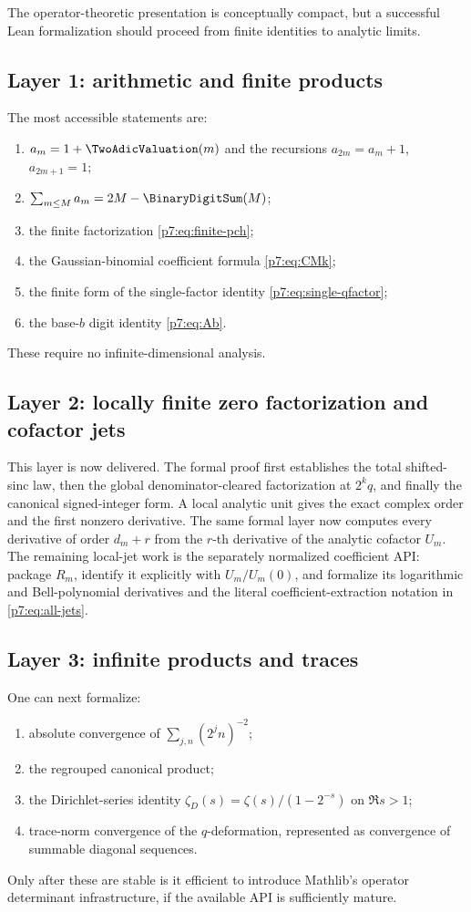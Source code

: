\documentclass[11pt]{article}
\numberwithin{equation}{section}
\theoremstyle{definition}
\theoremstyle{remark}
\begin{document}
The operator-theoretic presentation is conceptually compact, but a successful Lean formalization should proceed from finite identities to analytic limits.

\subsection{Layer 1: arithmetic and finite products}

The most accessible statements are:
\begin{enumerate}[leftmargin=2em]
\item $a_m=1+\TwoAdicValuation(m)$ and the recursions $a_{2m}=a_m+1$, $a_{2m+1}=1$;
\item $\sum_{m\le M}a_m=2M-\BinaryDigitSum(M)$;
\item the finite factorization \cref{p7:eq:finite-pch};
\item the Gaussian-binomial coefficient formula \cref{p7:eq:CMk};
\item the finite form of the single-factor identity \cref{p7:eq:single-qfactor};
\item the base-$b$ digit identity \cref{p7:eq:Ab}.
\end{enumerate}
These require no infinite-dimensional analysis.

\subsection{Layer 2: locally finite zero factorization and cofactor jets}

This layer is now delivered.  The formal proof first establishes the total
shifted-sinc law, then the global denominator-cleared factorization at
\(2^kq\), and finally the canonical signed-integer form.  A local analytic
unit gives the exact complex order and the first nonzero derivative.  The
same formal layer now computes every derivative of order \(d_m+r\) from the
\(r\)-th derivative of the analytic cofactor \(U_m\).  The remaining
local-jet work is the separately normalized coefficient API: package \(R_m\),
identify it explicitly with \(U_m/U_m(0)\), and formalize its logarithmic and
Bell-polynomial derivatives and the literal coefficient-extraction notation
in \cref{p7:eq:all-jets}.

\subsection{Layer 3: infinite products and traces}

One can next formalize:
\begin{enumerate}[leftmargin=2em]
\item absolute convergence of $\sum_{j,n}(2^jn)^{-2}$;
\item the regrouped canonical product;
\item the Dirichlet-series identity $\zeta_D(s)=\zeta(s)/(1-2^{-s})$ on $\Re s>1$;
\item trace-norm convergence of the $q$-deformation, represented as convergence of summable diagonal sequences.
\end{enumerate}
Only after these are stable is it efficient to introduce Mathlib's operator determinant infrastructure, if the available API is sufficiently mature.
\end{document}
